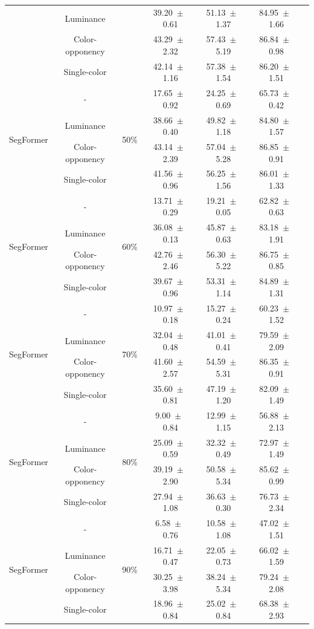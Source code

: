 \begin{table}[h]
\begin{tabular}{@{}lccc ccc@{}}
& Luminance & & 39.20~$\pm$~0.61 & 51.13~$\pm$~1.37 & 84.95~$\pm$~1.66 \\
& Color-opponency & & 43.29~$\pm$~2.32 & 57.43~$\pm$~5.19 & 86.84~$\pm$~0.98 \\
& Single-color & & 42.14~$\pm$~1.16 & 57.38~$\pm$~1.54 & 86.20~$\pm$~1.51 \\
\midrule
\multirow{4}{*}{SegFormer} & - & \multirow{4}{*}{50\%} & 17.65~$\pm$~0.92 & 24.25~$\pm$~0.69 & 65.73~$\pm$~0.42 \\
& Luminance & & 38.66~$\pm$~0.40 & 49.82~$\pm$~1.18 & 84.80~$\pm$~1.57 \\
& Color-opponency & & 43.14~$\pm$~2.39 & 57.04~$\pm$~5.28 & 86.85~$\pm$~0.91 \\
& Single-color & & 41.56~$\pm$~0.96 & 56.25~$\pm$~1.56 & 86.01~$\pm$~1.33 \\
\midrule
\multirow{4}{*}{SegFormer} & - & \multirow{4}{*}{60\%} & 13.71~$\pm$~0.29 & 19.21~$\pm$~0.05 & 62.82~$\pm$~0.63 \\
& Luminance & & 36.08~$\pm$~0.13 & 45.87~$\pm$~0.63 & 83.18~$\pm$~1.91 \\
& Color-opponency & & 42.76~$\pm$~2.46 & 56.30~$\pm$~5.22 & 86.75~$\pm$~0.85 \\
& Single-color & & 39.67~$\pm$~0.96 & 53.31~$\pm$~1.14 & 84.89~$\pm$~1.31 \\
\midrule
\multirow{4}{*}{SegFormer} & - & \multirow{4}{*}{70\%} & 10.97~$\pm$~0.18 & 15.27~$\pm$~0.24 & 60.23~$\pm$~1.52 \\
& Luminance & & 32.04~$\pm$~0.48 & 41.01~$\pm$~0.41 & 79.59~$\pm$~2.09 \\
& Color-opponency & & 41.60~$\pm$~2.57 & 54.59~$\pm$~5.31 & 86.35~$\pm$~0.91 \\
& Single-color & & 35.60~$\pm$~0.81 & 47.19~$\pm$~1.20 & 82.09~$\pm$~1.49 \\
\midrule
\multirow{4}{*}{SegFormer} & - & \multirow{4}{*}{80\%} & 9.00~$\pm$~0.84 & 12.99~$\pm$~1.15 & 56.88~$\pm$~2.13 \\
& Luminance & & 25.09~$\pm$~0.59 & 32.32~$\pm$~0.49 & 72.97~$\pm$~1.49 \\
& Color-opponency & & 39.19~$\pm$~2.90 & 50.58~$\pm$~5.34 & 85.62~$\pm$~0.99 \\
& Single-color & & 27.94~$\pm$~1.08 & 36.63~$\pm$~0.30 & 76.73~$\pm$~2.34 \\
\midrule
\multirow{4}{*}{SegFormer} & - & \multirow{4}{*}{90\%} & 6.58~$\pm$~0.76 & 10.58~$\pm$~1.08 & 47.02~$\pm$~1.51 \\
& Luminance & & 16.71~$\pm$~0.47 & 22.05~$\pm$~0.73 & 66.02~$\pm$~1.59 \\
& Color-opponency & & 30.25~$\pm$~3.98 & 38.24~$\pm$~5.34 & 79.24~$\pm$~2.08 \\
& Single-color & & 18.96~$\pm$~0.84 & 25.02~$\pm$~0.84 & 68.38~$\pm$~2.93 \\
\midrule
\bottomrule
\end{tabular}
\label{tab:sparse_results_segformer_acdc_rain}
\end{table}